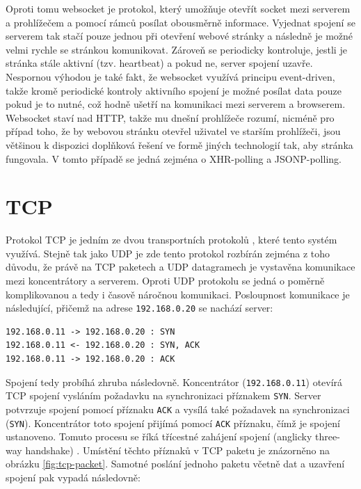 Oproti tomu websocket \cite{rfc6455} je protokol, který umožňuje otevřít socket mezi serverem a prohlížečem a pomocí rámců posílat obousměrně informace. Vyjednat spojení se serverem tak stačí pouze jednou při otevření webové stránky a následně je možné velmi rychle se stránkou komunikovat. Zároveň se periodicky kontroluje, jestli je stránka stále aktivní (tzv. heartbeat) a pokud ne, server spojení uzavře. Nespornou výhodou je také fakt, že websocket využívá principu event-driven, takže kromě periodické kontroly aktivního spojení je možné posílat data pouze pokud je to nutné, což hodně ušetří na komunikaci mezi serverem a browserem. Websocket  staví nad HTTP, takže mu dnešní prohlížeče rozumí, nicméně pro případ toho, že by webovou stránku otevřel uživatel ve starším prohlížeči, jsou většinou k dispozici doplňková řešení ve formě jiných technologií tak, aby stránka fungovala. V tomto případě se jedná zejména o XHR-polling a JSONP-polling.

\section{TCP}
Protokol TCP  je jedním ze dvou transportních protokolů \cite{mistrovstvi}, které tento systém využívá. Stejně tak jako UDP je zde tento protokol rozbírán zejména z toho důvodu, že právě na TCP paketech a UDP datagramech je vystavěna komunikace mezi koncentrátory a serverem. Oproti UDP protokolu se jedná o poměrně komplikovanou a tedy i časově náročnou komunikaci. Posloupnost komunikace je následující, přičemž na adrese \texttt{192.168.0.20} se  nachází server:

\begin{verbatim}
192.168.0.11 -> 192.168.0.20 : SYN
192.168.0.11 <- 192.168.0.20 : SYN, ACK
192.168.0.11 -> 192.168.0.20 : ACK
\end{verbatim}

Spojení tedy probíhá zhruba následovně. Koncentrátor (\texttt{192.168.0.11}) otevírá TCP spojení vysláním požadavku na synchronizaci příznakem \texttt{SYN}. Server potvrzuje spojení pomocí příznaku \texttt{ACK} a vysílá také požadavek na synchronizaci (\texttt{SYN}). Koncentrátor toto spojení přijímá pomocí \texttt{ACK} příznaku, čímž je spojení ustanoveno. Tomuto procesu se říká třícestné zahájení spojení (anglicky three-way handshake) \cite{mistrovstvi}. Umístění těchto příznaků v TCP paketu je znázorněno na obrázku \ref{fig:tcp-packet}. Samotné poslání jednoho paketu včetně dat a uzavření spojení pak vypadá následovně:

